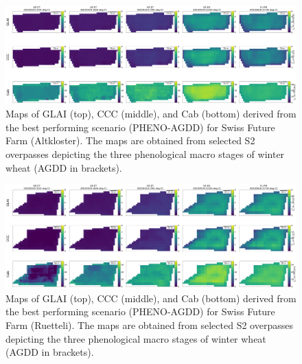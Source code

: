 \begin{figure}[H]
    \centering
    \includegraphics[width=1\textwidth]{05-Insights/img/SwissFutureFarm_Altkloster_Trait_Maps.png}
    \caption[Maps of GLAI (top), CCC (middle), and Cab (bottom) derived from the best performing scenario (PHENO-AGDD) for Swiss Future Farm (Altkloster). The maps are obtained from selected S2 overpasses depicting the three phenological macro stages of winter wheat (AGDD in brackets).]{Maps of GLAI (top), CCC (middle), and Cab (bottom) derived from the best performing scenario (PHENO-AGDD) for Swiss Future Farm (Altkloster). The maps are obtained from selected S2 overpasses depicting the three phenological macro stages of winter wheat (AGDD in brackets).}
    \label{fig:appendix_sff_altkloster_2022}
\end{figure}

\begin{figure}[H]
    \centering
    \includegraphics[width=1\textwidth]{05-Insights/img/SwissFutureFarm_Ruetteli_Trait_Maps.png}
    \caption[Maps of GLAI (top), CCC (middle), and Cab (bottom) derived from the best performing scenario (PHENO-AGDD) for Swiss Future Farm (Ruetteli). The maps are obtained from selected S2 overpasses depicting the three phenological macro stages of winter wheat (AGDD in brackets).]{Maps of GLAI (top), CCC (middle), and Cab (bottom) derived from the best performing scenario (PHENO-AGDD) for Swiss Future Farm (Ruetteli). The maps are obtained from selected S2 overpasses depicting the three phenological macro stages of winter wheat (AGDD in brackets).}
    \label{fig:appendix_sff_ruetteli_2022}
\end{figure}